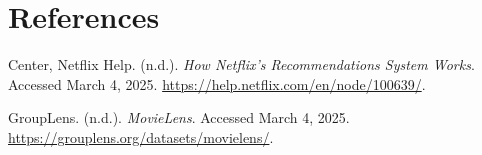 \documentclass[12pt]{article}
\begin{document}
\section{References}
\begin{thebibliography}{9}
Center, Netflix Help. (n.d.). \textit{How Netflix’s Recommendations System Works}. Accessed March 4, 2025. \url{https://help.netflix.com/en/node/100639/}.

GroupLens. (n.d.). \textit{MovieLens}. Accessed March 4, 2025. \url{https://grouplens.org/datasets/movielens/}.

\end{thebibliography}
\end{document}
